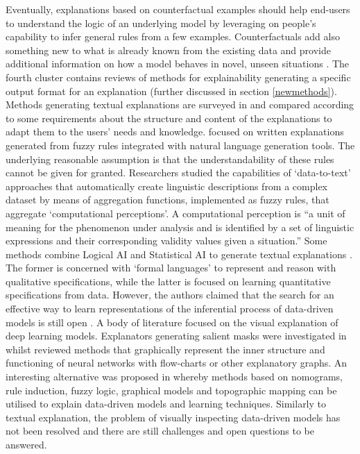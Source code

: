 \documentclass[final,1p,times]{elsarticle}
\begin{document}
Eventually, explanations based on counterfactual examples should help end-users to understand the logic of an underlying model by leveraging on people's capability to infer general rules from a few examples. Counterfactuals add also something new to what is already known from the existing data and provide additional information on how a model behaves in novel, unseen situations \cite{byrne2019counterfactuals}.
The fourth cluster contains reviews of methods for explainability generating a specific output format for an explanation (further discussed in section \ref{newmethods}). 
Methods generating textual explanations are surveyed in \cite{swartout1993explanation} and compared according to some requirements about the structure and content of the explanations to adapt them to the users' needs and knowledge.
\cite{mencar2018paving} focused on written explanations generated from fuzzy rules integrated with natural language generation tools. The underlying reasonable assumption is that the understandability of these rules cannot be given for granted. Researchers studied the capabilities of `data-to-text' approaches that automatically create linguistic descriptions from a complex dataset by means of aggregation functions, implemented as fuzzy rules, that aggregate `computational perceptions'. A computational perception is ``a unit of meaning for the phenomenon under analysis and is identified by a set of linguistic expressions and their corresponding validity values given a situation.'' Some methods combine Logical AI and Statistical AI to generate textual explanations \cite{belle2017logic}. The former is concerned with `formal languages' to represent and reason with qualitative specifications, while the latter is focused on learning quantitative specifications from data. However, the authors claimed that the search for an effective way to learn representations of the inferential process of data-driven models is still open \cite{belle2017logic}.
A body of literature focused on the visual explanation of deep learning models. Explanators generating salient masks were investigated in \cite{choo2018visual, zhang2018visual} whilst \cite{choo2018visual, craven1992visualizing} reviewed methods that graphically represent the inner structure and functioning of neural networks with flow-charts or other explanatory graphs. An interesting alternative was proposed in \cite{lisboa2013interpretability} whereby methods based on nomograms, rule induction, fuzzy logic, graphical models and topographic mapping can be utilised to explain data-driven models and learning techniques. Similarly to textual explanation, the problem of visually inspecting data-driven models has not been resolved and there are still challenges and open questions to be answered.
\end{document}
